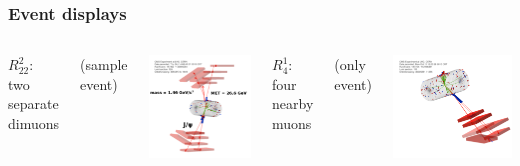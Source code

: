 \documentclass[compress]{beamer}
\begin{document}
\begin{frame}
\frametitle{Event displays}

\begin{columns}
\centering $R^2_{22}$: two separate dimuons

(sample event)

\includegraphics[width=\linewidth]{dimudimu_control_eventdisplay.png}


\vspace{0.1 cm}
\centering $R^1_4$: four nearby muons

(only event)

\includegraphics[width=\linewidth]{quadmu_control_eventdisplay.png}
\end{columns}
\end{frame}
\end{document}
